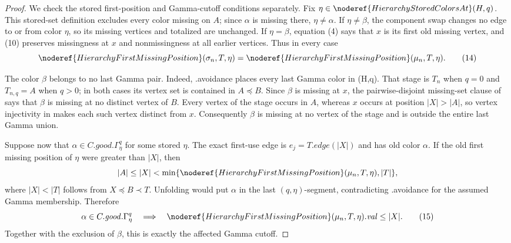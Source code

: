 \begin{proof}
We check the stored first-position and Gamma-cutoff conditions separately.
Fix \(\eta\in\noderef{HierarchyStoredColorsAt}(H,q)\).  This stored-set
definition excludes every color missing on \(A\); since \(\alpha\) is
missing there, \(\eta\ne\alpha\).  If \(\eta\ne\beta\), the component
swap changes no edge to or from color \(\eta\), so its missing vertices
and totalized  are unchanged.  If
\(\eta=\beta\), equation (4) says that \(x\) is its first old missing
vertex, and (10) preserves missingness at \(x\) and nonmissingness at all
earlier vertices.  Thus in every case
\[
 \noderef{HierarchyFirstMissingPosition}(\sigma_n,T,\eta)
 =\noderef{HierarchyFirstMissingPosition}(\mu_n,T,\eta).     \tag{14}
\]

The color \(\beta\) belongs to no last Gamma pair.  Indeed,
.avoidance places every last Gamma color in
(H,q).  That stage is \(T_n\) when
\(q=0\) and \(T_{n,q}=A\) when \(q>0\); in both cases its vertex set is
contained in \(A\preccurlyeq B\).  Since \(\beta\) is missing at \(x\),
the pairwise-disjoint missing-set clause of
 says that \(\beta\) is missing at no
distinct vertex of \(B\).  Every vertex of the stage occurs in \(A\),
whereas \(x\) occurs at position \(|X|>|A|\), so vertex injectivity in
 makes each such vertex distinct from \(x\).
Consequently \(\beta\) is missing at no vertex of the stage and is outside
the entire last Gamma union.

Suppose now that \(\alpha\in C.\mathit{good}.\Gamma^q_\eta\) for some
stored \(\eta\).  The exact first-use edge is \(e_j=T.\mathit{edge}(|X|)\)
and has old color \(\alpha\).  If the old first missing position of
\(\eta\) were greater than \(|X|\), then
\[
 |A|\le |X|<
 \min\{\noderef{HierarchyFirstMissingPosition}(\mu_n,T,\eta),|T|\},
\]
where \(|X|<|T|\) follows from \(X\preccurlyeq B\prec T\).
Unfolding  would put \(\alpha\) in the
last \((q,\eta)\)-segment, contradicting
.avoidance for the assumed Gamma membership.
Therefore
\[
 \alpha\in C.\mathit{good}.\Gamma^q_\eta
 \quad\Longrightarrow\quad
 \noderef{HierarchyFirstMissingPosition}(\mu_n,T,\eta).\mathit{val}
 \le |X|.                                                     \tag{15}
\]
Together with the exclusion of \(\beta\), this is exactly the affected
Gamma cutoff.


\end{proof}
